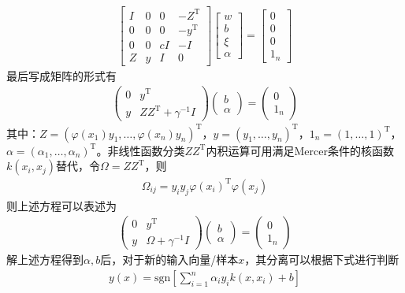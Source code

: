        \begin{align*}
        \begin{bmatrix}
        I & 0 & 0 & -Z^\mathrm{T}\\
        0 & 0 & 0 & -y^\mathrm{T}\\
        0 & 0 & cI&  -I\\
        Z & y & I & 0
        \end{bmatrix}
        \begin{bmatrix}
        w\\
        b\\
        \xi\\
        \alpha
        \end{bmatrix}
        =\begin{bmatrix}
        0\\
        0\\
        0\\
        1_{n}
        \end{bmatrix}
        \end{align*}
        最后写成矩阵的形式有
        \begin{align*}
        \begin{pmatrix}
        0 & y^\mathrm{T}\\
        y& ZZ^\mathrm{T}+\gamma^{-1}I
        \end{pmatrix}
        \begin{pmatrix}
        b\\
        \alpha
        \end{pmatrix}
        =\begin{pmatrix}
        0\\
        1_{n}
        \end{pmatrix}
        \end{align*}
        其中：$Z = (\varphi(x_1)y_1,\dots,\varphi(x_n)y_n )^\mathrm{T}$，$y = (y_1,\dots,y_n)^\mathrm{T}$，$1_n=(1,\dots,1)^\mathrm{T}$，$\alpha = (\alpha_1,\dots,\alpha_n)^\mathrm{T}$。非线性函数分类$ZZ^\mathrm{T}$内积运算可用满足Mercer条件的核函数$k(x_i,x_j)$替代，令$\Omega = ZZ^\mathrm{T}$，则
        \begin{align*}
        \Omega_{ij} = y_iy_j\varphi(x_i)^\mathrm{T}\varphi(x_j)
        \end{align*}
        则上述方程可以表述为
        \begin{align*}
        \begin{pmatrix}
        0 & y^\mathrm{T}\\
        y & \Omega+\gamma^{-1}I
        \end{pmatrix}
        \begin{pmatrix}
        b\\
        \alpha
        \end{pmatrix}
        =\begin{pmatrix}
        0\\
        1_{n}
        \end{pmatrix}
        \end{align*}
        解上述方程得到$\alpha,b$后，对于新的输入向量/样本$x$，其分离可以根据下式进行判断
        \begin{align*}
        y(x) = \mathrm{sgn} \left[ \sum_{i=1}^n\alpha_iy_i k(x,x_i) +b \right]
        \end{align*}
